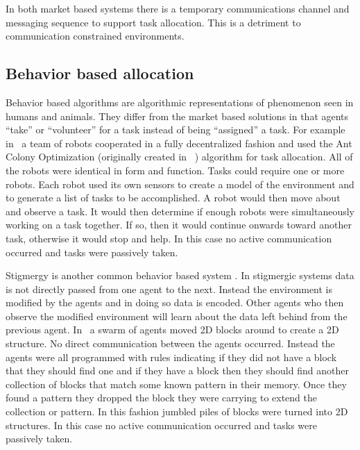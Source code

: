 In both market based systems there is a temporary communications channel and messaging sequence to support task allocation.  This is a detriment to communication constrained environments.

\subsection{Behavior based allocation}

Behavior based algorithms are algorithmic representations of phenomenon seen in humans and animals. They differ from the market based solutions in that agents ``take'' or ``volunteer'' for a task instead of being ``assigned'' a task.  For example in~\textcite{ant_colony_opt} a team of robots cooperated in a fully decentralized fashion and used the Ant Colony Optimization (originally created in ~\textcite{orig_aco}) algorithm for task allocation.  All of the robots were identical in form and function.  Tasks could require one or more robots.  Each robot used its own sensors to create a model of the environment and to generate a list of tasks to be accomplished.  A robot would then move about and observe a task.  It would then determine if enough robots were simultaneously working on a task together.  If so, then it would continue onwards toward another task, otherwise it would stop and help.  In this case no active communication occurred and tasks were passively taken.

Stigmergy is another common behavior based system \parencite{history_stigmergy} \parencite{social_cog_stigmergy}. In stigmergic systems data is not directly passed from one agent to the next.  Instead the environment is modified by the agents and in doing so data is encoded.  Other agents who then observe the modified environment will learn about the data left behind from the previous agent.  In~\textcite{stigmergy_building} a swarm of agents moved 2D blocks around to create a 2D structure.  No direct communication between the agents occurred.  Instead the agents were all programmed with rules indicating if they did not have a block that they should find one and if they have a block then they should find another collection of blocks that match some known pattern in their memory.  Once they found a pattern they dropped the block they were carrying to extend the collection or pattern.  In this fashion jumbled piles of blocks were turned into 2D structures.  In this case no active communication occurred and tasks were passively taken.

